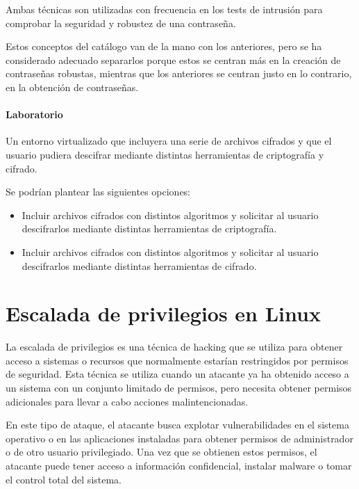             Ambas técnicas son utilizadas con frecuencia en los tests de intrusión para comprobar la seguridad y robustez de una contraseña.

            Estos conceptos del catálogo van de la mano con los anteriores, pero se ha considerado adecuado separarlos porque estos se centran más en la creación de contraseñas robustas, mientras que los anteriores se centran justo en lo contrario, en la obtención de contraseñas. 

            \paragraph{Laboratorio}

                Un entorno virtualizado que incluyera una serie de archivos cifrados y que el usuario pudiera descifrar mediante distintas herramientas de criptografía y cifrado.

                Se podrían plantear las siguientes opciones:
                
                \begin{itemize}
                    \item Incluir archivos cifrados con distintos algoritmos y solicitar al usuario descifrarlos mediante distintas herramientas de criptografía.
                    \item Incluir archivos cifrados con distintos algoritmos y solicitar al usuario descifrarlos mediante distintas herramientas de cifrado.
                \end{itemize}

    
    \section{Escalada de privilegios en Linux}

        La escalada de privilegios es una técnica de hacking que se utiliza para obtener acceso a sistemas o recursos que normalmente estarían restringidos por permisos de seguridad. Esta técnica se utiliza cuando un atacante ya ha obtenido acceso a un sistema con un conjunto limitado de permisos, pero necesita obtener permisos adicionales para llevar a cabo acciones malintencionadas.
            
        En este tipo de ataque, el atacante busca explotar vulnerabilidades en el sistema operativo o en las aplicaciones instaladas para obtener permisos de administrador o de otro usuario privilegiado. Una vez que se obtienen estos permisos, el atacante puede tener acceso a información confidencial, instalar malware o tomar el control total del sistema.

